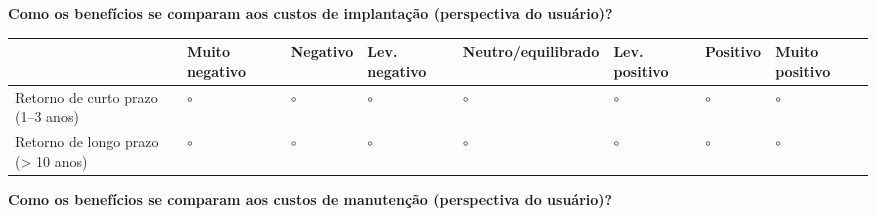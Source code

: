 \textbf{Como os benefícios se comparam aos custos de implantação (perspectiva do usuário)?}

{
\begin{longtable}[]{@{}
  >{\raggedright\arraybackslash}p{}
  >{\centering\arraybackslash}p{}
  >{\centering\arraybackslash}p{}
  >{\centering\arraybackslash}p{}
  >{\centering\arraybackslash}p{}
  >{\centering\arraybackslash}p{}
  >{\centering\arraybackslash}p{}
  >{\centering\arraybackslash}p{}@{}}
\toprule\noalign{}
\begin{minipage}[b]{\linewidth}\raggedright
\end{minipage} & \begin{minipage}[b]{\linewidth}\centering
Muito negativo
\end{minipage} & \begin{minipage}[b]{\linewidth}\centering
Negativo
\end{minipage} & \begin{minipage}[b]{\linewidth}\centering
Lev. negativo
\end{minipage} & \begin{minipage}[b]{\linewidth}\centering
Neutro/equilibrado
\end{minipage} & \begin{minipage}[b]{\linewidth}\centering
Lev. positivo
\end{minipage} & \begin{minipage}[b]{\linewidth}\centering
Positivo
\end{minipage} & \begin{minipage}[b]{\linewidth}\centering
Muito positivo
\end{minipage} \\
\midrule\noalign{}
\endhead
\bottomrule\noalign{}
\endlastfoot
Retorno de curto prazo (1--3 anos) & $\circ$ & $\circ$ & $\circ$ & $\circ$ & $\circ$ & $\circ$ & $\circ$ \\
Retorno de longo prazo (\textgreater{} 10 anos) & $\circ$ & $\circ$ & $\circ$ & $\circ$ & $\circ$ & $\circ$ & $\circ$ \\
\end{longtable}
}

\textbf{Como os benefícios se comparam aos custos de manutenção (perspectiva do usuário)?}

